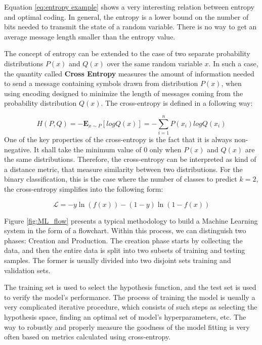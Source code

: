 Equation \ref{eq:entropy example} shows a very interesting relation between entropy and optimal coding. In general, the entropy is a lower bound on the number of bits needed to transmit the state of a random variable. There is no way to get an average message length smaller than the entropy value.   

The concept of entropy can be extended to the case of two separate probability distributions $P(x)$ and $Q(x)$ over the same random variable $x$.  In such a case, the quantity called \textbf{Cross Entropy}  measures the amount of information needed to send a message containing symbols drawn from distribution $P(x)$, when using encoding designed to minimize the length of messages coming from the probability distribution $Q(x)$.  
The cross-entropy is defined in a following way:

\begin{equation}
H(P,Q) = - \mathbf{E}_{x\sim P}[log Q(x)] = - \sum_{i=1}^{n} P(x_i)log Q(x_i)
\end{equation}
One of the key properties of the cross-entropy is the fact that it is always non-negative. It shall take the minimum value of $0$ only when $P(x)$ and $Q(x)$ are the same distributions. Therefore, the cross-entropy can be interpreted as kind of a distance metric, that measure similarity between two distributions. For the binary classification, this is the case where the number of classes to predict $k=2$, the cross-entropy simplifies into the following form:

\begin{equation}
\label{eq:CE_binary}
   \mathcal{L} = -y \ln\left( f(x) \right) - (1-y) \ln\left(1 -f(x) \right)
\end{equation}


Figure \ref{fig:ML_flow} presents a typical methodology to build a Machine Learning system in the form of a flowchart. 
Within this process, we can distinguish two phases: Creation and Production. The creation phase starts by collecting the data, and then the entire data is split into two subsets of training and testing samples. The former is usually divided into two disjoint sets training and validation sets.

The training set is used to select the hypothesis function, and the test set is used to verify the model's performance.
The process of training the model is usually a very complicated iterative procedure, which consists of such steps as selecting the hypothesis space, finding an optimal set of model's hyperparameters, etc. The way to robustly and properly measure the goodness of the model fitting is very often based on metrics calculated using cross-entropy.

